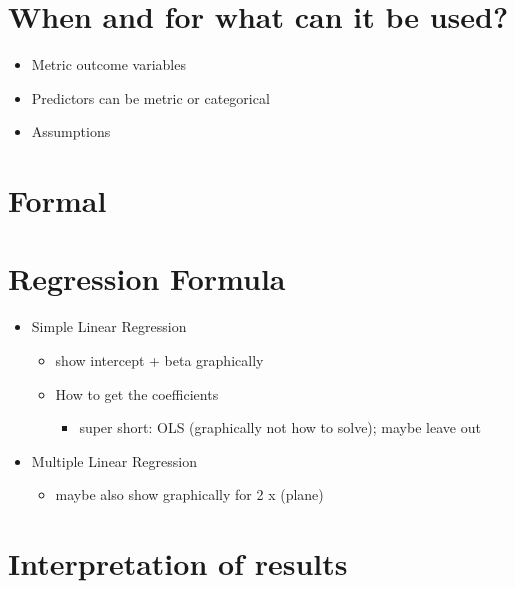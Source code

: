 \documentclass[
]{book}
\providecommand{\tightlist}{%
  \setlength{\itemsep}{0pt}\setlength{\parskip}{0pt}}
\begin{document}
\hypertarget{when-and-for-what-can-it-be-used}{%
\section{When and for what can it be used?}\label{when-and-for-what-can-it-be-used}}

\begin{itemize}
\item
  Metric outcome variables
\item
  Predictors can be metric or categorical
\item
  Assumptions
\end{itemize}

\hypertarget{formal}{%
\section{Formal}\label{formal}}

\hypertarget{regression-formula}{%
\section{Regression Formula}\label{regression-formula}}

\begin{itemize}
\tightlist
\item
  Simple Linear Regression

  \begin{itemize}
  \tightlist
  \item
    show intercept + beta graphically
  \item
    How to get the coefficients

    \begin{itemize}
    \tightlist
    \item
      super short: OLS (graphically not how to solve); maybe leave out
    \end{itemize}
  \end{itemize}
\item
  Multiple Linear Regression

  \begin{itemize}
  \tightlist
  \item
    maybe also show graphically for 2 x (plane)
  \end{itemize}
\end{itemize}

\hypertarget{interpretation-of-results}{%
\section{Interpretation of results}\label{interpretation-of-results}}
\end{document}
